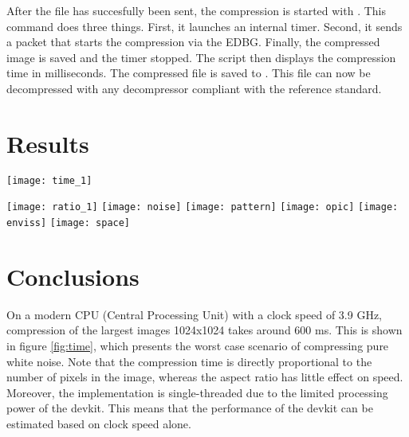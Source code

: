 \documentclass[12pt, a4paper]{article}
\begin{document}
\medskip
\noindent
After the file has succesfully been sent, the compression is started with . 
This command does three things. 
First, it launches an internal timer. 
Second, it sends a packet that starts the compression via the EDBG. 
Finally, the compressed image is saved and the timer stopped. 
The script then displays the compression time in milliseconds. 
The compressed file is saved to . 
This file can now be decompressed with any decompressor compliant with the reference standard.

\newpage
\section{Results}
\begin{minipage}{\textwidth}
\centering
\medskip
\texttt{[image: time\_1]}
\label{fig:time}
\bigskip
\end{minipage}

\begin{minipage}{\textwidth}
\centering
\medskip
\texttt{[image: ratio\_1]}\vfill
\texttt{[image: noise]}
\texttt{[image: pattern]}
\texttt{[image: opic]}
\texttt{[image: enviss]}
\texttt{[image: space]}
\label{fig:ratio}
\end{minipage}

\newpage
\section{Conclusions}

\noindent
On a modern CPU (Central Processing Unit) with a clock speed of 3.9 GHz, 
compression of the largest images 1024x1024 takes around 600 ms. 
This is shown in figure \ref{fig:time}, which presents the worst case scenario of compressing pure white noise.
Note that the compression time is directly proportional to the number of pixels in the image, 
whereas the aspect ratio has little effect on speed.
Moreover, the implementation is single-threaded due to the limited processing power of the devkit. 
This means that the performance of the devkit can be estimated based on clock speed alone.
\end{document}
